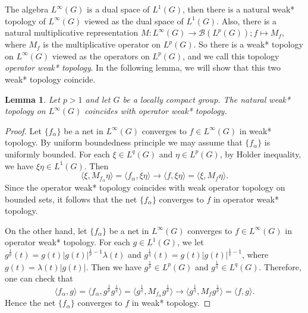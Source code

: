 \documentclass[reqno,11pt]{amsart}
\theoremstyle{plain}
\newtheorem{lem}[thm]{Lemma}
\theoremstyle{definition}
\theoremstyle{remark}
\newcommand{\la}{\langle}
\newcommand{\ra}{\rangle}
\begin{document}
The algebra $L^\infty(G)$ is a dual space of $L^1(G)$, then there is a natural weak* topology of $L^\infty(G)$ viewed as the dual space of $L^1(G)$. Also, there is a natural multiplicative representation $M:L^\infty(G)\rightarrow \mathcal{B}(L^p(G)); f\mapsto M_f$, where $M_f$ is the multiplicative operator on $L^p(G)$. So there is a weak* topology on $L^\infty(G)$  viewed as the operators on $L^p(G)$, and we call this topology  {\it operator weak* topology}. In the following lemma, we will show that this two weak* topology coincide.
\begin{lem}
Let $p>1$ and let $G$ be a locally compact group. The natural weak* topology on $L^\infty(G)$ coincides with operator weak* topology.
\end{lem}
\begin{proof}
Let $\{f_\alpha\}$ be a net in $L^\infty(G)$ converges to $f\in L^\infty(G)$ in weak* topology. By uniform boundedness principle we may assume
that $\{f_\alpha\}$ is uniformly bounded. For each $\xi\in L^q(G)$ and $\eta\in L^p(G)$, by H$\ddot{\mathrm{o}}$lder inequality, we have $\xi\eta\in L^1(G)$. Then $$\la \xi,M_{f_\alpha}\eta\ra=\la f_\alpha, \xi\eta\ra\rightarrow \la f,\xi\eta\ra=\la \xi,M_f\eta\ra.$$
Since the operator weak* topology coincides with weak operator topology on bounded sets, it follows that the net $\{f_\alpha\}$ converges to $f$ in operator weak* topology.

On the other hand, let $\{f_\alpha\}$ be a net in $L^\infty(G)$ converges to $f\in L^\infty(G)$ in operator weak* topology. For each $g\in L^1(G)$, we let $g^{\frac{1}{p}}(t)=g(t)|g(t)|^{\frac{1}{p}-1}\lambda(t)$ and $g^{\frac{1}{q}}(t)=g(t)|g(t)|^{\frac{1}{q}-1}$, where $g(t)=\lambda(t)|g(t)|$. Then we have $g^{\frac{1}{p}}\in L^p(G)$ and $g^{\frac{1}{q}}\in L^q(G)$. Therefore, one can check that $$\la f_\alpha,g\ra=\la f_\alpha, g^{\frac{1}{p}}g^{\frac{1}{q}}\ra=\la g^{\frac{1}{q}}, M_{f_\alpha} g^{\frac{1}{p}}\ra\rightarrow \la g^{\frac{1}{q}}, M_{f} g^{\frac{1}{p}}\ra=\la f,g\ra.$$
Hence the net $\{f_\alpha\}$ converges to $f$ in weak* topology.
\end{proof}
\end{document}
